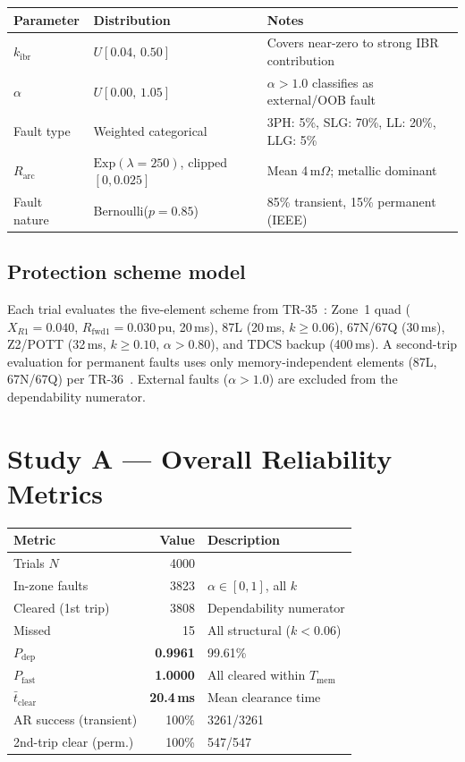 \documentclass[11pt,a4paper]{article}
\begin{document}
\begin{center}
\begin{tabular}{@{}lll@{}}
\toprule
Parameter & Distribution & Notes\\
\midrule
$k_\mathrm{ibr}$ & $U[0.04,\,0.50]$ & Covers near-zero to strong IBR contribution\\
$\alpha$ & $U[0.00,\,1.05]$ & $\alpha>1.0$ classifies as external/OOB fault\\
Fault type & Weighted categorical & 3PH: 5\%, SLG: 70\%, LL: 20\%, LLG: 5\%\\
$R_\mathrm{arc}$ & $\mathrm{Exp}(\lambda=250)$, clipped $[0,0.025]$ & Mean 4\,m$\Omega$;
  metallic dominant\\
Fault nature & Bernoulli($p=0.85$) & 85\% transient, 15\% permanent (IEEE)\\
\bottomrule
\end{tabular}
\end{center}

\subsection{Protection scheme model}

Each trial evaluates the five-element scheme from TR-35~\cite{SAMBP_TR35}:
Zone~1 quad ($X_{R1}=0.040$, $R_\mathrm{fwd1}=0.030$\,pu, 20\,ms),
87L (20\,ms, $k\geq0.06$), 67N/67Q (30\,ms), Z2/POTT (32\,ms, $k\geq0.10$,
$\alpha>0.80$), and TDCS backup (400\,ms).  A second-trip evaluation for
permanent faults uses only memory-independent elements (87L, 67N/67Q) per
TR-36~\cite{SAMBP_TR36}.  External faults ($\alpha>1.0$) are excluded from
the dependability numerator.

\section{Study A --- Overall Reliability Metrics}
\label{sec:studyA}

\begin{center}
\begin{tabular}{@{}lrl@{}}
\toprule
Metric & Value & Description\\
\midrule
Trials $N$ & 4000 & \\
In-zone faults & 3823 & $\alpha\in[0,1]$, all $k$\\
Cleared (1st trip) & 3808 & Dependability numerator\\
Missed & 15 & All structural ($k<0.06$)\\
$P_\mathrm{dep}$ & \textbf{0.9961} & 99.61\%\\
$P_\mathrm{fast}$ & \textbf{1.0000} & All cleared within $T_\mathrm{mem}$\\
$\bar{t}_\mathrm{clear}$ & \textbf{20.4\,ms} & Mean clearance time\\
AR success (transient) & 100\% & 3261/3261\\
2nd-trip clear (perm.) & 100\% & 547/547\\
\bottomrule
\end{tabular}
\end{center}
\end{document}
